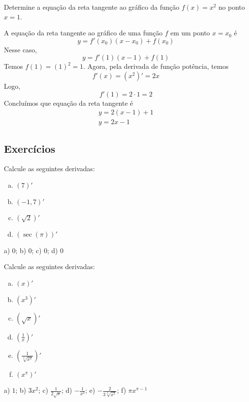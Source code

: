 \begin{exeresol}
  Determine a equação da reta tangente ao gráfico da função $f(x) = x^2$ no ponto $x=1$.
\end{exeresol}
\begin{resol}
  A equação da reta tangente ao gráfico de uma função $f$ em um ponto $x = x_0$ é
  \begin{equation}
    y = f'(x_0)(x-x_0) + f(x_0)
  \end{equation}
  Nesse caso,
  \begin{equation}
    y = f'(1)(x-1) + f(1)
  \end{equation}
  Temos $f(1) = (1)^2 = 1$. Agora, pela derivada de função potência, temos
  \begin{equation}
    f'(x) = (x^2)' = 2x
  \end{equation}
  Logo,
  \begin{equation}
    f'(1) = 2\cdot 1 = 2
  \end{equation}
  Concluímos que equação da reta tangente é
  \begin{gather}
    y = 2(x-1) + 1\\
    y = 2x - 1
  \end{gather}
\end{resol}

\subsection*{Exercícios}

\begin{exer}
  Calcule as seguintes derivadas:
  \begin{enumerate}[a)]
  \item $(7)'$
  \item $(-1,7)'$
  \item $\left(\sqrt{2}\right)'$
  \item $\left(\sec(\pi)\right)'$
  \end{enumerate}
\end{exer}
\begin{resp}
  a) $0$; b) $0$; c) $0$; d) $0$
\end{resp}

\begin{exer}
  Calcule as seguintes derivadas:
  \begin{enumerate}[a)]
  \item $\left(x\right)'$
  \item $\left(x^3\right)'$
  \item $\left(\sqrt{x}\right)'$
  \item $\displaystyle\left(\frac{1}{x}\right)'$
  \item $\displaystyle\left(\frac{1}{\sqrt[3]{x^2}}\right)'$
  \item $\left(x^\pi\right)'$
  \end{enumerate}
\end{exer}
\begin{resp}
  a) $1$; b) $3x^2$; c) $\displaystyle\frac{1}{2\sqrt{x}}$; d) $\displaystyle -\frac{1}{x^2}$; e) $\displaystyle -\frac{2}{3\sqrt[3]{x^5}}$; f) $\pi x^{\pi - 1}$
\end{resp}

